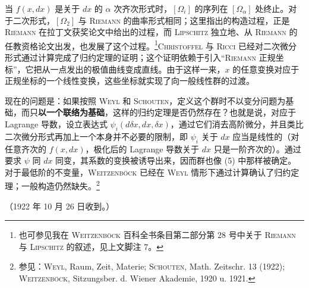 \documentclass[11pt]{article}
\newcommand{\srcemph}[1]{\textbf{#1}}
\newcommand{\srcname}[1]{\textsc{#1}}
\begin{document}
当 $f(x,d x)$ 是关于 $d x$ 的 $\alpha$ 次齐次形式时，$[\Omega_i]$ 的序列在 $[\Omega_\alpha]$ 处终止。对于二次形式，$[\Omega_2]$ 与 \srcname{Riemann} 的曲率形式相同；这里指出的构造过程，正是 \srcname{Riemann} 在拉丁文获奖论文中给出的过程，而 \srcname{Lipschitz} 独立地、从 \srcname{Riemann} 的任教资格论文出发，也发展了这个过程。\footnote{也可参见我在 \textsc{Weitzenböck} 百科全书条目第二部分第 28 号中关于 \textsc{Riemann} 与 \textsc{Lipschitz} 的叙述，见上文脚注 7。}\srcname{Christoffel} 与 \srcname{Ricci} 已经对二次微分形式通过计算完成了归约定理的证明；这个证明依赖于引入“\srcname{Riemann} 正规坐标”，它把从一点发出的极值曲线变成直线。由于这样一来，$x$ 的任意变换对应于正规坐标的一个线性变换，这些坐标就实现了向一般线性群的过渡。

现在的问题是：如果按照 \srcname{Weyl} 和 \srcname{Schouten}，定义这个群时不以变分问题为基础，而只\srcemph{以一个联络为基础}，这样的归约定理是否仍然存在？也就是说，对应于 Lagrange 导数，设立表达式 $\psi_i(d\delta x,d x,\delta x)$，通过它们消去高阶微分，并且类比二次微分形式再加上一个本身并不必要的限制，即 $\psi_i$ 关于 $d x$ 应当是线性的（对任意齐次的 $f(x,d x)$，极化后的 Lagrange 导数关于 $d x$ 只是一阶齐次的）。通过要求 $\psi$ 同 $d x$ 同变，其系数的变换被诱导出来，因而群也像 (5) 中那样被确定。对于最低阶的不变量，\srcname{Weitzenböck} 已经在 \srcname{Weyl} 情形下通过计算确认了归约定理；一般构造仍然缺失。\footnote{参见：\textsc{Weyl}, Raum, Zeit, Materie; \textsc{Schouten}, Math. Zeitschr. 13 (1922); \textsc{Weitzenböck}, Sitzungsber. d. Wiener Akademie, 1920 u. 1921.}

\begin{center}
（1922 年 10 月 26 日收到。）
\end{center}
\endgroup
\end{document}
